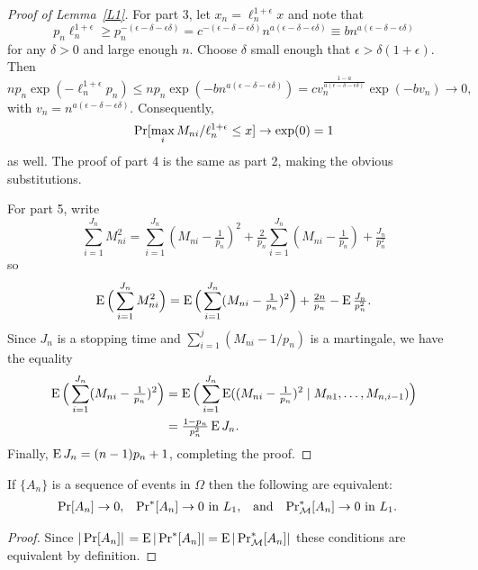 \documentclass[11pt]{article}
\providecommand{\DIFadd}[1]{{\protect\color{blue}\uwave{#1}}} %
\providecommand{\DIFdel}[1]{{\protect\color{red}\sout{#1}}}                      %
\providecommand{\DIFaddbegin}{} %
\providecommand{\DIFaddend}{} %
\providecommand{\DIFdelbegin}{} %
\providecommand{\DIFdelend}{} %
\begin{document}
\begin{proof}[Proof of Lemma~\ref{L1}]
  For part 3, let $x_n = \ell_n^{1 + \epsilon} x$ and note that
  \begin{equation*}
    p_n \ell_n^{1+\epsilon} \geq p_n^{-(\epsilon-\delta-\epsilon\delta)} =
    c^{-(\epsilon-\delta-\epsilon\delta)}
    n^{a(\epsilon-\delta-\epsilon\delta)} \equiv b n^{a(\epsilon
      - \delta - \epsilon\delta)}
  \end{equation*}
  for any $\delta > 0$ and large enough $n$.  Choose $\delta$ small
  enough that $\epsilon > \delta(1 +\epsilon)$. Then
  \begin{equation*}
    n p_n \exp(-\ell_n^{1+\epsilon} p_n) \leq n p_n
    \exp(-b n^{a(\epsilon -
      \delta - \epsilon\delta)}) = c
    v_n^{\frac{1-a}{a(\epsilon-\delta-\epsilon\delta)}}
    \exp(-b v_n) \to 0,
  \end{equation*}
  with $v_n = n^{a(\epsilon-\delta-\epsilon\delta)}$.  Consequently,
  \begin{equation*}
    \operatorname{Pr}[\max_i M_{ni}/\ell_n^{1+\epsilon} \leq x ] \to \exp(0) = 1
  \end{equation*}
  as well.
  The proof of part 4 is the same as part 2, making the obvious
  substitutions.

  For part 5, write
  \begin{equation}\label{eq:41}
    \sum_{i=1}^{J_n} M_{ni}^2 =
    \sum_{i=1}^{J_n} (M_{ni} - \tfrac{1}{p_n})^2
    + \tfrac{2}{p_n} \sum_{i=1}^{J_n} (M_{ni} - \tfrac{1}{p_n})
    + \tfrac{J_n}{p_n^2}
  \end{equation}
  so
  \begin{equation*}
    \operatorname{E} \Big( \sum_{i=1}^{J_n} M_{ni}^2 \Big)
    = \operatorname{E}\Big( \sum_{i=1}^{J_n} (M_{ni} - \tfrac{1}{p_n})^2 \Big)
    + \tfrac{2 n}{p_n} - \operatorname{E} \tfrac{J_n}{p_n^2}.
  \end{equation*}
  Since $J_n$ is a stopping time and $\sum_{i=1}^j (M_{ni} - 1/p_n)$
  is a martingale, we have the equality \citep[Lemma 6]{CRT:65}
  \begin{align*}
    \operatorname{E}\Big( \sum_{i=1}^{J_n} (M_{ni} - \tfrac{1}{p_n})^2 \Big)
    &= \operatorname{E}\Big( \sum_{i=1}^{J_n} \operatorname{E}((M_{ni} - \tfrac{1}{p_n})^2 \mid M_{n1},\dots,M_{n,i-1})\Big)\\
    &= \tfrac{1 - p_n}{p_n^2} \operatorname{E} J_n.
  \end{align*}
  Finally, $\operatorname{E} J_n = (n-1) p_n + 1$, completing the proof.
\end{proof}

\begin{lem}\label{L2}
  If $\{A_n\}$ is a sequence of events in $\Omega$ then the following
  are equivalent:
  \begin{align*}
  \operatorname{Pr}[A_n] &\to 0, &
  \operatorname{Pr}^*[A_n] &\to 0 \text{\ in\ }L_1, &
  &\text{and}&
  \operatorname{Pr}_{\mathcal{M}}^*[A_n] &\to 0 \text{\ in\ }L_1.
  \end{align*}
\end{lem}
\begin{proof}
  Since \DIFdelbegin \DIFdel{$|\operatorname{Pr}[A_n]|$} \DIFdelend \DIFaddbegin \DIFadd{$\pr[A_n]$} \DIFaddend
  $= \operatorname{E} |\operatorname{Pr}^*[A_n]| = \operatorname{E} |\operatorname{Pr}^*_{\mathcal{M}}[A_n]|$ these
  conditions are equivalent by definition.
\end{proof}
\end{document}
